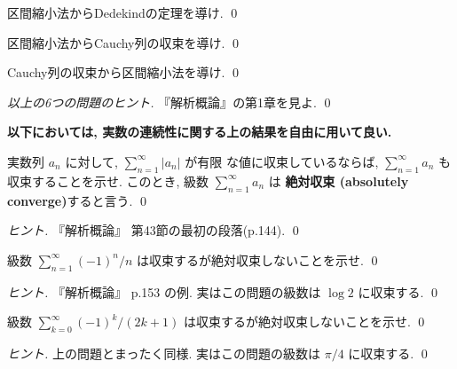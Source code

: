 \documentclass[12pt,twoside]{jarticle}
\begin{document}
\begin{question}\qstar{*}
  区間縮小法からDedekindの定理を導け. \qed
\end{question}

\begin{question}\qstar{*}
  区間縮小法からCauchy列の収束を導け. \qed
\end{question}

\begin{question}\qstar{*}
  Cauchy列の収束から区間縮小法を導け. \qed
\end{question}

\begin{proof}[以上の6つの問題のヒント]
 『解析概論』\cite{takagi}の第1章を見よ. \qed
\end{proof}

\bigskip
{\large\bf 以下においては, 実数の連続性に関する上の結果を自由に用いて良い.}

\begin{question}
  実数列 $a_n$ に対して, $\displaystyle\sum_{n=1}^\infty|a_n|$ が有限
  な値に収束しているならば, $\displaystyle\sum_{n=1}^\infty a_n$ も
  収束することを示せ. このとき, 級数 $\displaystyle\sum_{n=1}^\infty a_n$ は
  {\bf 絶対収束 (absolutely converge)}すると言う.  \qed
\end{question}

\begin{proof}[ヒント]
 『解析概論』\cite{takagi} 第43節の最初の段落(p.144). \qed
\end{proof}

\begin{question}
 級数 $\sum_{n=1}^\infty (-1)^n/n$ は収束するが絶対収束しないことを示せ. \qed
\end{question}

\begin{proof}[ヒント]
 『解析概論』\cite{takagi} p.153 の例. 
  実はこの問題の級数は $\log 2$ に収束する.
  \qed
\end{proof}

\begin{question}
 級数 $\sum_{k=0}^\infty (-1)^k/(2k+1)$ は収束するが絶対収束しないことを示せ. \qed
\end{question}

\begin{proof}[ヒント]
 上の問題とまったく同様.
 実はこの問題の級数は $\pi/4$ に収束する.
 \qed
\end{proof}
\end{document}
